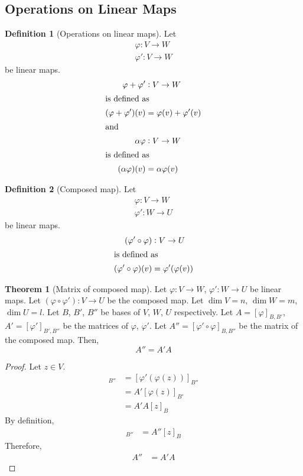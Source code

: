 \documentclass[fleqn, a4paper, 12pt]{article}
\theoremstyle{definition}
\newtheorem{definition}{Definition} %
\theoremstyle{theorem}
\newtheorem{theorem}{Theorem} %
\theoremstyle{remark}
\numberwithin{corollary}{theorem}
\numberwithin{equation}{theorem}
\begin{document}
\subsection{Operations on Linear Maps}

\begin{definition}[Operations on linear maps]
	Let
	\begin{align*}
		\varphi : V \to W\\
		\varphi' : V \to W
	\end{align*}
	be linear maps.
	\begin{align*}
		\varphi + \varphi' &: V \to W\\
		\intertext{is defined as}
		(\varphi + \varphi')(v) &= \varphi(v) + \varphi'(v)\\
		\intertext{and}
		\alpha \varphi &: V \to W\\
		\intertext{is defined as}
		(\alpha \varphi)(v) &= \alpha \varphi(v)
	\end{align*}
\end{definition}

\begin{definition}[Composed map]
	Let
	\begin{align*}
		\varphi : V \to W\\
		\varphi' : W \to U
	\end{align*}
	be linear maps.
	\begin{align*}
	(\varphi' \circ \varphi) &: V \to U\\
	\intertext{is defined as}
	(\varphi' \circ \varphi)(v) &= \varphi'(\varphi(v))
	\end{align*}
\end{definition}

\begin{theorem}[Matrix of composed map]
	Let $\varphi : V \to W$, $\varphi' : W \to U$ be linear maps. Let $(\varphi \circ \varphi') : V \to U$ be the composed map. Let $\dim V = n$, $\dim W = m$, $\dim U = l$. Let $B$, $B'$, $B''$ be bases of $V$, $W$, $U$ respectively. Let $A = [\varphi]_{B, B'}$, $A' = [\varphi']_{B', B''}$ be the matrices of $\varphi$, $\varphi'$. Let $A'' = [\varphi' \circ \varphi]_{B, B''}$ be the matrix of the composed map. Then, 
	\begin{equation*}
		A'' = A' A
	\end{equation*}
\end{theorem}

\begin{proof}
	Let $z \in V$.
	\begin{align*}
		[(\varphi' \circ \varphi)(z)]_{B''} &= [\varphi' (\varphi (z))]_{B''}\\
		&= A' [\varphi (z)]_{B'}\\
		&= A' A [z]_B
	\end{align*}
	By definition,
	\begin{align*}
		[(\varphi' \circ \varphi) (z)]_{B''} &= A'' [z]_B
	\end{align*}
	Therefore,
	\begin{align*}
		A'' &= A' A
	\end{align*}
\end{proof}
\end{document}
